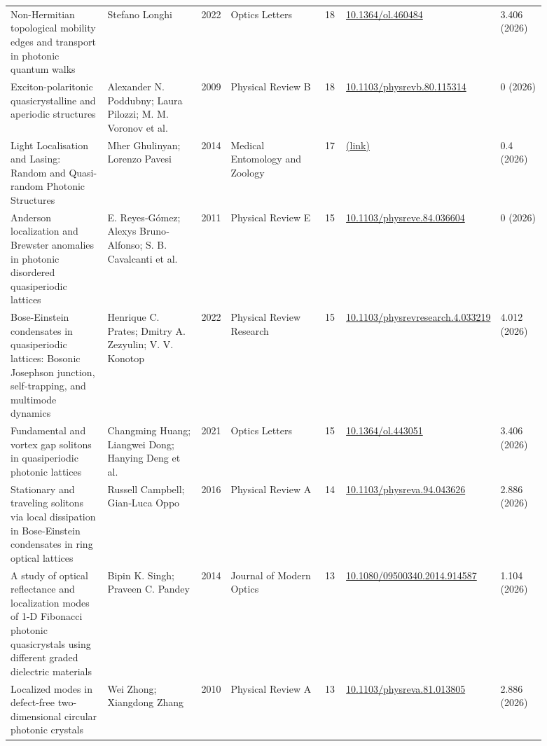 \documentclass[10pt,a4paper]{article}
\begin{document}
{\begin{longtable}{p{0.192\linewidth}p{0.192\linewidth}p{0.043\linewidth}p{0.192\linewidth}p{0.043\linewidth}p{0.132\linewidth}p{0.096\linewidth}}
Non-Hermitian topological mobility edges and transport in photonic quantum walks & Stefano Longhi & 2022 & Optics Letters & 18 & \href{https://doi.org/10.1364/ol.460484}{10.1364/ol.460484} & 3.406 (2026) \\
Exciton-polaritonic quasicrystalline and aperiodic structures & Alexander N. Poddubny; Laura Pilozzi; M. M. Voronov et al. & 2009 & Physical Review B & 18 & \href{https://doi.org/10.1103/physrevb.80.115314}{10.1103/physrevb.80.115314} & 0 (2026) \\
Light Localisation and Lasing: Random and Quasi-random Photonic Structures & Mher Ghulinyan; Lorenzo Pavesi & 2014 & Medical Entomology and Zoology & 17 & \href{https://openalex.org/W641369541}{(link)} & 0.4 (2026) \\
Anderson localization and Brewster anomalies in photonic disordered quasiperiodic lattices & E. Reyes‐Gómez; Alexys Bruno‐Alfonso; S. B. Cavalcanti et al. & 2011 & Physical Review E & 15 & \href{https://doi.org/10.1103/physreve.84.036604}{10.1103/physreve.84.036604} & 0 (2026) \\
Bose-Einstein condensates in quasiperiodic lattices: Bosonic Josephson junction, self-trapping, and multimode dynamics & Henrique C. Prates; Dmitry A. Zezyulin; V. V. Konotop & 2022 & Physical Review Research & 15 & \href{https://doi.org/10.1103/physrevresearch.4.033219}{10.1103/physrevresearch.4.033219} & 4.012 (2026) \\
Fundamental and vortex gap solitons in quasiperiodic photonic lattices & Changming Huang; Liangwei Dong; Hanying Deng et al. & 2021 & Optics Letters & 15 & \href{https://doi.org/10.1364/ol.443051}{10.1364/ol.443051} & 3.406 (2026) \\
Stationary and traveling solitons via local dissipation in Bose-Einstein condensates in ring optical lattices & Russell Campbell; Gian‐Luca Oppo & 2016 & Physical Review A & 14 & \href{https://doi.org/10.1103/physreva.94.043626}{10.1103/physreva.94.043626} & 2.886 (2026) \\
A study of optical reflectance and localization modes of 1-D Fibonacci photonic quasicrystals using different graded dielectric materials & Bipin K. Singh; Praveen C. Pandey & 2014 & Journal of Modern Optics & 13 & \href{https://doi.org/10.1080/09500340.2014.914587}{10.1080/09500340.2014.914587} & 1.104 (2026) \\
Localized modes in defect-free two-dimensional circular photonic crystals & Wei Zhong; Xiangdong Zhang & 2010 & Physical Review A & 13 & \href{https://doi.org/10.1103/physreva.81.013805}{10.1103/physreva.81.013805} & 2.886 (2026) \\

\end{longtable}}
\end{document}
